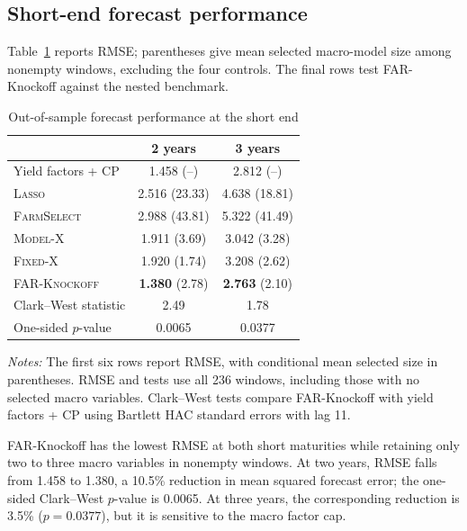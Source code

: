 \subsection{Short-end forecast performance}
\label{sec:app_results_v7}

Table~\ref{tab:empirical_comparison_v7} reports RMSE; parentheses give mean
selected macro-model size among nonempty windows, excluding the four controls.
The final rows test FAR-Knockoff against the nested benchmark.

\begin{table}[H]
\caption{Out-of-sample forecast performance at the short end}
\label{tab:empirical_comparison_v7}
\centering
\small
\setlength{\tabcolsep}{8pt}
\renewcommand{\arraystretch}{1.08}
\begin{tabular}{lcc}
\toprule
 & 2 years & 3 years \\
\midrule
Yield factors + CP       & 1.458 (--) & 2.812 (--) \\
\textsc{Lasso}           & 2.516 (23.33) & 4.638 (18.81) \\
\textsc{FarmSelect}      & 2.988 (43.81) & 5.322 (41.49) \\
\textsc{Model-X}         & 1.911 (3.69) & 3.042 (3.28) \\
\textsc{Fixed-X}         & 1.920 (1.74) & 3.208 (2.62) \\
\textsc{FAR-Knockoff}    & \textbf{1.380} (2.78) & \textbf{2.763} (2.10) \\
\midrule
Clark--West statistic    & 2.49 & 1.78 \\
One-sided $p$-value      & 0.0065 & 0.0377 \\
\bottomrule
\end{tabular}

\vspace{2pt}
\begin{minipage}{0.92\textwidth}
\footnotesize
\emph{Notes:} The first six rows report RMSE, with conditional mean selected
size in parentheses. RMSE and tests use all 236 windows, including those with
no selected macro variables. Clark--West tests compare FAR-Knockoff with yield
factors + CP using Bartlett HAC standard errors with lag 11.
\end{minipage}
\end{table}

FAR-Knockoff has the lowest RMSE at both short maturities while retaining only
two to three macro variables in nonempty windows. At two years, RMSE falls
from 1.458 to 1.380, a 10.5\% reduction in mean squared forecast error;
the one-sided Clark--West $p$-value is 0.0065. At three years, the corresponding
reduction is 3.5\% ($p=0.0377$), but it is sensitive to the macro factor cap.

